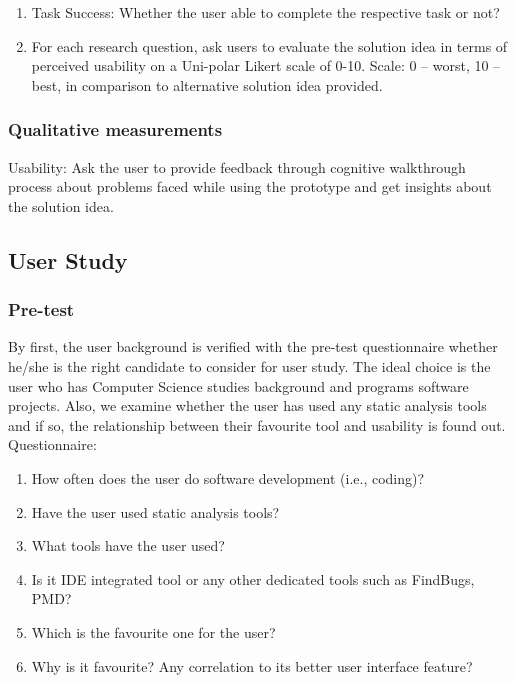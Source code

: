 \begin{enumerate}
\item Task Success: Whether the user able to complete the respective task or not?
\item For each research question, ask users to evaluate the solution idea in terms of perceived usability on a Uni-polar Likert scale of 0-10. Scale: 0 – worst, 10 – best, in comparison to alternative solution idea provided.
\end{enumerate} 

\subsubsection{Qualitative measurements} 

Usability: Ask the user to provide feedback through cognitive walkthrough process about problems faced while using the prototype and get insights about the solution idea.

\subsection{User Study}

\subsubsection{Pre-test}

By first, the user background is verified with the pre-test questionnaire whether he/she is the right candidate to consider for user study. The ideal choice is the user who has Computer Science studies background and programs software projects. Also, we examine whether the user has used any static analysis tools and if so, the relationship between their favourite tool and usability is found out. \\

Questionnaire: \\

\begin{enumerate}
\item How often does the user do software development (i.e., coding)?
\item Have the user used static analysis tools?
\item What tools have the user used?
\item Is it IDE integrated tool or any other dedicated tools such as FindBugs, PMD?
\item Which is the favourite one for the user?  
\item Why is it favourite? Any correlation to its better user interface feature? \\
\end{enumerate}

